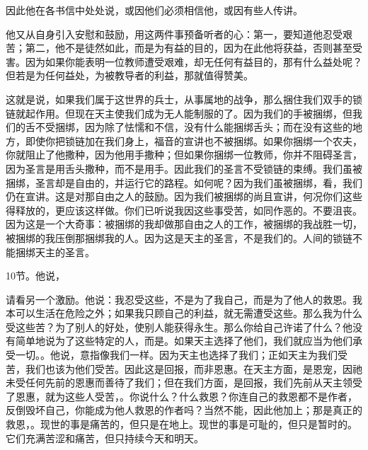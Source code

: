  因此他在各书信中处处说，或因他们必须相信他，或因有些人传讲。\par

他又从自身引入安慰和鼓励，用这两件事预备听者的心：第一，要知道他忍受艰苦；第二，他不是徒然如此，而是为有益的目的，因为在此他将获益，否则甚至受害。因为如果你能表明一位教师遭受艰难，却无任何有益目的，那有什么益处呢？但若是为任何益处，为被教导者的利益，那就值得赞美。\par

 这就是说，如果我们属于这世界的兵士，从事属地的战争，那么捆住我们双手的锁链就起作用。但现在天主使我们成为无人能制服的了。因为我们的手被捆绑，但我们的舌不受捆绑，因为除了怯懦和不信，没有什么能捆绑舌头；而在没有这些的地方，即使你把锁链加在我们身上，福音的宣讲也不被捆绑。如果你捆绑一个农夫，你就阻止了他撒种，因为他用手撒种；但如果你捆绑一位教师，你并不阻碍圣言，因为圣言是用舌头撒种，而不是用手。因此我们的圣言不受锁链的束缚。我们虽被捆绑，圣言却是自由的，并运行它的路程。如何呢？因为我们虽被捆绑，看，我们仍在宣讲。这是对那自由之人的鼓励。因为我们被捆绑的尚且宣讲，何况你们这些得释放的，更应该这样做。你们已听说我因这些事受苦，如同作恶的。不要沮丧。因为这是一个大奇事：被捆绑的我却做那自由之人的工作，被捆绑的我战胜一切，被捆绑的我压倒那捆绑我的人。因为这是天主的圣言，不是我们的。人间的锁链不能捆绑天主的圣言。\par

10节。他说，\par

请看另一个激励。他说：我忍受这些，不是为了我自己，而是为了他人的救恩。我本可以生活在危险之外；如果我只顾自己的利益，就无需遭受这些。那么我为什么受这些苦？为了别人的好处，使别人能获得永生。那么你给自己许诺了什么？他没有简单地说为了这些特定的人，而是。如果天主选择了他们，我们就应当为他们承受一切。。他说，意指像我们一样。因为天主也选择了我们；正如天主为我们受苦，我们也该为他们受苦。因此这是回报，而非恩惠。在天主方面，是恩宠，因祂未受任何先前的恩惠而善待了我们；但在我们方面，是回报，我们先前从天主领受了恩惠，就为这些人受苦，。你说什么？什么救恩？你连自己的救恩都不是作者，反倒毁坏自己，你能成为他人救恩的作者吗？当然不能，因此他加上；那是真正的救恩，。现世的事是痛苦的，但只是在地上。现世的事是可耻的，但只是暂时的。它们充满苦涩和痛苦，但只持续今天和明天。\par

